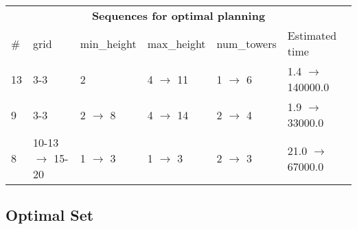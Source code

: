 \documentclass{article}
\begin{document}
                            \begin{center}
                            \begin{tabular}{l|l|l|l|l|l}
                            \multicolumn{6}{c}{\bf \large Sequences for optimal planning}\\
                            \# & grid & min\_height & max\_height & num\_towers & Estimated time\\\midrule
                            13&3-3&2&4 $\rightarrow$ 11&1 $\rightarrow$ 6&1.4 $\rightarrow$ 140000.0\\
9&3-3&2 $\rightarrow$ 8&4 $\rightarrow$ 14&2 $\rightarrow$ 4&1.9 $\rightarrow$ 33000.0\\
8&10-13 $\rightarrow$ 15-20&1 $\rightarrow$ 3&1 $\rightarrow$ 3&2 $\rightarrow$ 3&21.0 $\rightarrow$ 67000.0
                            \end{tabular}
                            \end{center}
                    
                                \subsection*{Optimal Set}
                                
\end{document}
